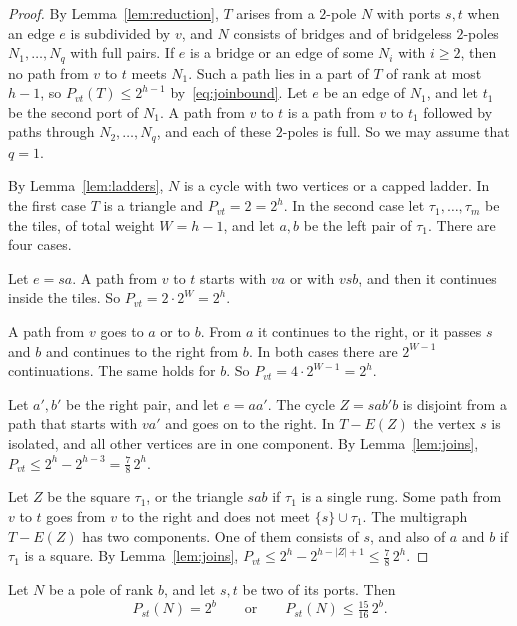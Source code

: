 \begin{proof}
By Lemma~\ref{lem:reduction}, $T$ arises from a $2$-pole $N$ with ports $s,t$ when an edge $e$ is
subdivided by $v$, and $N$ consists of bridges and of bridgeless $2$-poles $N_1,\dots,N_q$ with
full pairs. If $e$ is a bridge or an edge of some $N_i$ with $i\ge2$, then no path from $v$ to $t$
meets $N_1$. Such a path lies in a part of $T$ of rank at most $h-1$, so $P_{vt}(T)\le2^{h-1}$
by~\eqref{eq:joinbound}. Let $e$ be an edge of $N_1$, and let $t_1$ be the second port of $N_1$. A
path from $v$ to $t$ is a path from $v$ to $t_1$ followed by paths through $N_2,\dots,N_q$, and
each of these $2$-poles is full. So we may assume that $q=1$.

By Lemma~\ref{lem:ladders}, $N$ is a cycle with two vertices or a capped ladder. In the first
case $T$ is a triangle and $P_{vt}=2=2^{h}$. In the second case let $\tau_1,\dots,\tau_m$ be the
tiles, of total weight $W=h-1$, and let $a,b$ be the left pair of $\tau_1$. There are four cases.

 Let $e=sa$. A path from $v$ to $t$ starts with $va$ or with $vsb$,
and then it continues inside the tiles. So $P_{vt}=2\cdot2^{W}=2^{h}$.

 A path from $v$ goes to $a$ or to $b$. From $a$ it
continues to the right, or it passes $s$ and $b$ and continues to the right from $b$. In both
cases there are $2^{W-1}$ continuations. The same holds for $b$. So $P_{vt}=4\cdot2^{W-1}=2^{h}$.

 Let $a',b'$ be the right pair, and let $e=aa'$. The
cycle $Z=sab'b$ is disjoint from a path that starts with $va'$ and goes on to the right. In
$T-E(Z)$ the vertex $s$ is isolated, and all other vertices are in one component. By
Lemma~\ref{lem:joins}, $P_{vt}\le2^{h}-2^{h-3}=\frac78\,2^{h}$.

 Let $Z$ be the square $\tau_1$, or the
triangle $sab$ if $\tau_1$ is a single rung. Some path from $v$ to $t$ goes from $v$ to the right
and does not meet $\{s\}\cup\tau_1$. The multigraph $T-E(Z)$ has two components. One of them
consists of $s$, and also of $a$ and $b$ if $\tau_1$ is a square. By Lemma~\ref{lem:joins},
$P_{vt}\le2^{h}-2^{h-|Z|+1}\le\frac78\,2^{h}$.
\end{proof}

\begin{theorem}[Gap]\label{thm:gap}
Let $N$ be a pole of rank $b$, and let $s,t$ be two of its ports. Then
\[
  P_{st}(N)=2^{b}\qquad\text{or}\qquad P_{st}(N)\le\tfrac{15}{16}\,2^{b}.
\]
\end{theorem}

